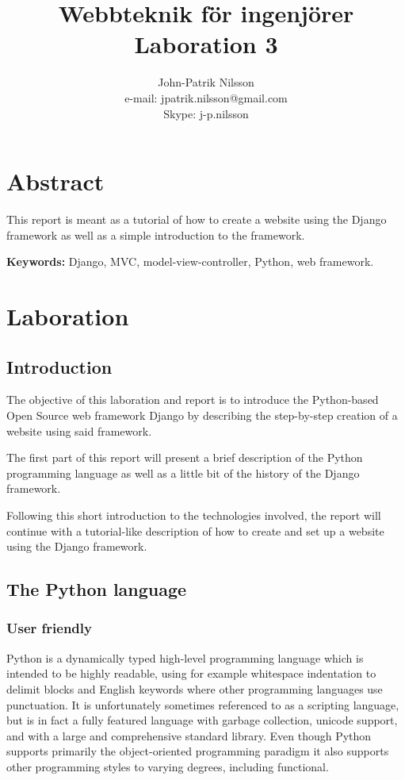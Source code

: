\documentclass[a4paper,10pt]{article}
\title{Webbteknik för ingenjörer \\
	Laboration 3}
\author{John-Patrik Nilsson \\
	e-mail: jpatrik.nilsson@gmail.com \\
	Skype: j-p.nilsson}
\begin{document}
\maketitle

\pagestyle{empty}
\thispagestyle{empty}

\section{Abstract}
This report is meant as a tutorial of how to create a website using the Django framework as well as a simple introduction to the framework.

\textbf{Keywords:} Django, MVC, model-view-controller, Python, web framework.

\section{Laboration}
\subsection{Introduction}
The objective of this laboration and report is to introduce the Python-based Open Source web framework Django by describing the step-by-step creation of a website using said framework.

The first part of this report will present a brief description of the Python programming language as well as a little bit of the history of the Django framework.

Following this short introduction to the technologies involved, the report will continue with a tutorial-like description of how to create and set up a website using the Django framework.

\subsection{The Python language}
\subsubsection{User friendly}
Python is a dynamically typed high-level programming language which is intended to be highly readable, using for example whitespace indentation to delimit blocks and English keywords where other programming languages use punctuation. It is unfortunately sometimes referenced to as a scripting language, but is in fact a fully featured language with garbage collection, unicode support, and with a large and comprehensive standard library. Even though Python supports primarily the object-oriented programming paradigm it also supports other programming styles to varying degrees, including functional.
\end{document}
